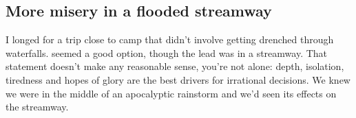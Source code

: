
\subsection{More misery in a flooded streamway}
\begin{marginfigure}
\end{marginfigure}
I longed for a trip close to camp that didn't involve getting drenched through waterfalls.  seemed a good option, though the lead was in a streamway. That statement doesn't make any reasonable sense, you're not alone: depth, isolation, tiredness and hopes of glory are the best drivers for irrational decisions. We knew we were in the middle of an apocalyptic rainstorm and we'd seen its effects on the  streamway.

